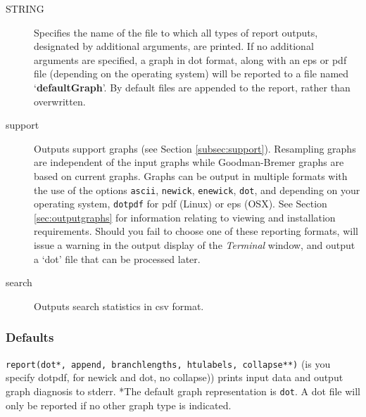 \begin{description}
		\item [STRING] Specifies the name of the file to which all types of report 
		outputs, designated by additional arguments, are printed. If no additional 
		arguments are specified, a graph in dot format, along with an eps or pdf 
		file (depending on the operating system) will be reported to a file named 
		`\textbf{defaultGraph}'. By default files are appended to the report, rather 
		than overwritten. 
				
		\item[support] Outputs support graphs (see Section \ref{subsec:support}). 
		Resampling graphs \citep{Farrisetal1996} are independent of the input graphs 
		while Goodman-Bremer graphs \citep{Goodmanetal1982, bremer1994} are 
		based on current graphs. Graphs can be output in multiple formats with the
		use of the options \texttt{ascii}, \texttt{newick}, \texttt{enewick}, \texttt{dot}, 
		and depending on your operating system, \texttt{dotpdf} for pdf (Linux) or 
		eps (OSX). See Section \ref{sec:outputgraphs} for information relating to 
		viewing and installation requirements. Should you fail to choose one of 
		these reporting formats, \phyg will issue a warning in the output display 
		of the \textit{Terminal} window, and output a `dot' file that can be processed 
		later.
		
		\item[search] Outputs search statistics in csv format.
		 
	\end{description}			
		
	\subsubsection{Defaults}
		\texttt{report(dot*, append, branchlengths, htulabels, collapse**)}
		(is you specify dotpdf, for newick and dot, no collapse)) prints input data and output graph diagnosis to stderr. 
		*The default graph representation is \texttt{dot}. A dot file will only be reported if no other graph type is indicated.
		
